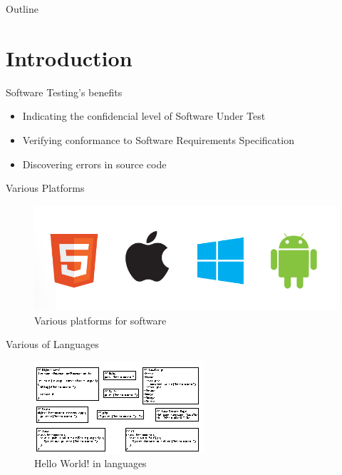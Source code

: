 \documentclass{beamer}
\title{\ThesisNameEN}
\subtitle{IMECS2017}
\date[2017.03.14]{\today}
\author{\authorNameEN~\small{and~\advisorEn}}
\institute{{\facultyEn}, {\universityEn}}
\begin{document}
\maketitle

\begin{frame}[t]{Outline}
    \tableofcontents[hideallsubsections]
\end{frame}

%
\section{Introduction}
\begin{frame}{Software Testing's benefits}
  \begin{itemize}
     \item Indicating the confidencial level of Software Under Test
     \item Verifying conformance to Software Requirements Specification
     \item Discovering errors in source code
  \end{itemize}
\end{frame}

\begin{frame}{Various Platforms}
    \begin{figure}
        \includegraphics[width=.8\paperwidth]{figure/mobile_bugs}
        \caption{Various platforms for software}
        \label{fig:variousplatform}
    \end{figure}
\end{frame}

\begin{frame}{Various of Languages}
    \begin{figure}
        \includegraphics[width=.9\paperwidth]{figure/hello-world-lang}
        \caption{Hello World! in languages}
        \label{fig:helloworld}
    \end{figure}
\end{frame}
\end{document}
